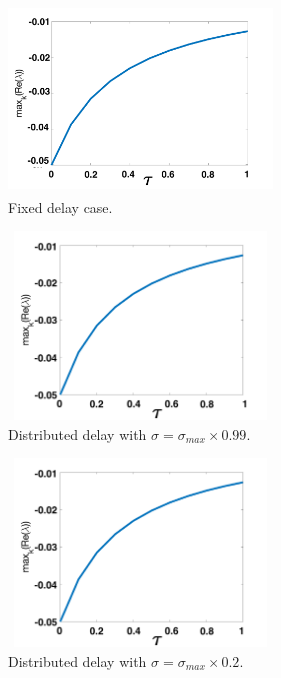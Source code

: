 \documentclass[12pt]{report}
\begin{document}
\begin{figure}[H]
    \centering
    \begin{subfigure}[b]{0.45\textwidth}
        \centering
        \includegraphics[width=7cm,height=5cm]{p3fixed.png}
        \caption{Fixed delay case.}
        \label{}
    \end{subfigure}
    \hfill
    \begin{subfigure}[b]{0.45\textwidth}
        \centering
        \includegraphics[width=7cm,height=5cm]{p3sigmax.png}
        \caption{Distributed delay with $\sigma=\sigma_{max}\times0.99$.}
        \label{}
    \end{subfigure}
    \hfill
    \begin{subfigure}[b]{0.45\textwidth}
        \centering
        \includegraphics[width=7cm,height=5cm]{p3sigmax5.png}
        \caption{Distributed delay with $\sigma=\sigma_{max}\times0.2$.}
        \label{}
    \end{subfigure}
    \hfill
    \begin{subfigure}[b]{0.45\textwidth}
        \centering

\end{subfigure}
\end{figure}
\end{document}
